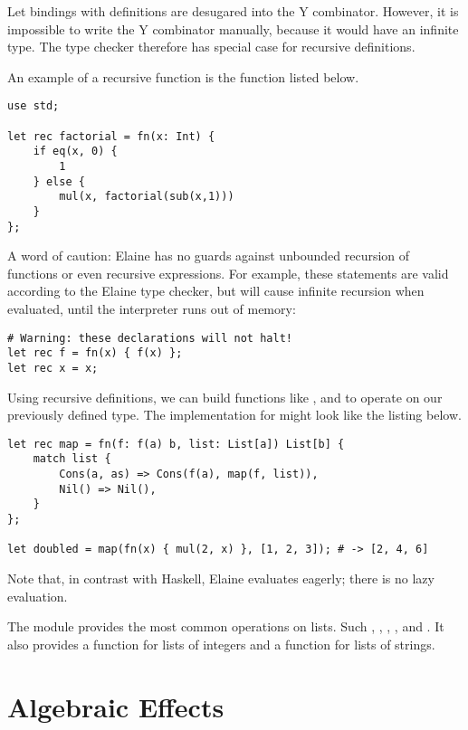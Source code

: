 Let bindings with  definitions are desugared into the Y combinator. However, it is impossible to write the Y combinator manually, because it would have an infinite type. The type checker therefore has special case for recursive definitions.

An example of a recursive function is the  function listed below.

\begin{lstlisting}[language=elaine,style=fancy]
use std;

let rec factorial = fn(x: Int) {
    if eq(x, 0) {
        1
    } else {
        mul(x, factorial(sub(x,1)))
    }
};
\end{lstlisting}

A word of caution: Elaine has no guards against unbounded recursion of functions or even recursive expressions. For example, these statements are valid according to the Elaine type checker, but will cause infinite recursion when evaluated, until the interpreter runs out of memory:

\begin{lstlisting}[language=elaine,style=fancy]
# Warning: these declarations will not halt!
let rec f = fn(x) { f(x) };
let rec x = x;
\end{lstlisting}

Using recursive definitions, we can build functions like ,  and  to operate on our previously defined  type. The implementation for  might look like the listing below.

\begin{lstlisting}[language=elaine,style=fancy]
let rec map = fn(f: f(a) b, list: List[a]) List[b] {
    match list {
        Cons(a, as) => Cons(f(a), map(f, list)),
        Nil() => Nil(),
    }
};

let doubled = map(fn(x) { mul(2, x) }, [1, 2, 3]); # -> [2, 4, 6]
\end{lstlisting}

Note that, in contrast with Haskell, Elaine evaluates  eagerly; there is no lazy evaluation.

The  module provides the most common operations on lists. Such , , , ,  and . It also provides a  function for lists of integers and a  function for lists of strings.

\section{Algebraic Effects}

